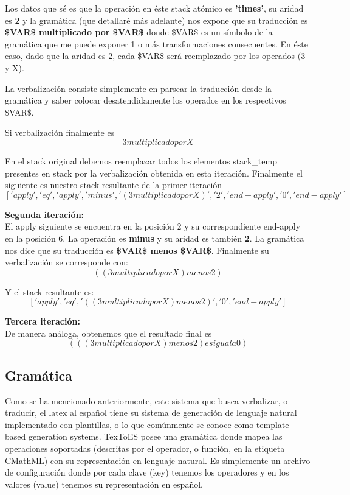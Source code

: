 Los datos que sé es que la operación en éste stack atómico es \textbf{'times'}, su aridad es \textbf{2} y la gramática (que detallaré más adelante) nos expone que su traducción es \textbf{\$VAR\$ multiplicado por \$VAR\$} donde \$VAR\$ es un símbolo de la gramática que me puede exponer 1 o más transformaciones consecuentes. En éste caso, dado que la aridad es 2, cada \$VAR\$ será reemplazado por los operados (3 y X).

La verbalización consiste simplemente en parsear la traducción desde la gramática y saber colocar desatendidamente los operados en los respectivos \$VAR\$.

Si verbalización finalmente es
$$3 multiplicado por X$$

En el stack original debemos reemplazar todos los elementos stack\_temp presentes en stack por la verbalización obtenida en esta iteración. Finalmente el siguiente es nuestro stack resultante de la primer iteración
$$['apply', 'eq', 'apply', 'minus', '(3 multiplicado por X)', '2', 'end-apply', '0', 'end-apply']$$

{\Large \textbf{Segunda iteración:\\}}
El apply siguiente se encuentra en la posición 2 y su correspondiente end-apply en la posición 6. La operación es \textbf{minus} y su aridad es también \textbf{2}. La gramática nos dice que su traducción es \textbf{\$VAR\$ menos \$VAR\$}. Finalmente su verbalización se corresponde con:
$$((3 multiplicado por X) menos 2)$$

Y el stack resultante es:
$$['apply', 'eq', '((3 multiplicado por X) menos 2)', '0', 'end-apply']$$

{\Large \textbf{Tercera iteración:\\}}
De manera análoga, obtenemos que el resultado final es
$$(((3 multiplicado por X) menos 2) es igual a 0)$$


\subsection{Gramática}

Como se ha mencionado anteriormente, este sistema que busca verbalizar, o traducir, el latex al español tiene su sistema
de generación de lenguaje natural implementado con plantillas, o lo que comúnmente se conoce como template-based generation systems.
TexToES posee una gramática donde mapea las operaciones soportadas (descritas por el operador, o función, en la etiqueta CMathML) con su representación en lenguaje natural. Es simplemente un archivo de configuración donde por cada clave (key) tenemos los operadores y en los valores (value) tenemos su representación en español.\\

